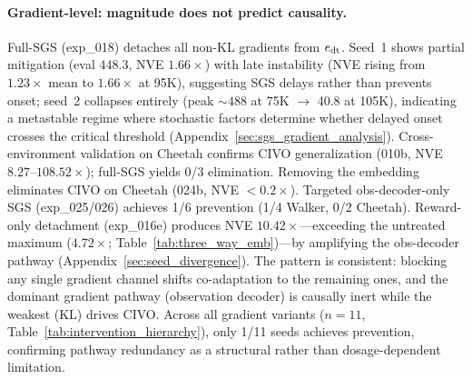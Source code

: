 \paragraph{Gradient-level: magnitude does not predict causality.}
Full-SGS (exp\_018) detaches all non-KL gradients from $e_{\mathrm{dt}}$. Seed~1 shows partial mitigation (eval 448.3, NVE $1.66\times$) with late instability (NVE rising from $1.23\times$ mean to $1.66\times$ at 95K), suggesting SGS delays rather than prevents onset; seed~2 collapses entirely (peak ${\sim}488$ at 75K $\to$ 40.8 at 105K), indicating a metastable regime where stochastic factors determine whether delayed onset crosses the critical threshold (Appendix~\ref{sec:sgs_gradient_analysis}). Cross-environment validation on Cheetah confirms CIVO generalization (010b, NVE $8.27$--$108.52\times$); full-SGS yields 0/3 elimination. Removing the embedding eliminates CIVO on Cheetah (024b, NVE $< 0.2\times$). Targeted obs-decoder-only SGS (exp\_025/026) achieves 1/6 prevention (1/4 Walker, 0/2 Cheetah). Reward-only detachment (exp\_016e) produces NVE $10.42\times$---exceeding the untreated maximum ($4.72\times$; Table~\ref{tab:three_way_emb})---by amplifying the obs-decoder pathway (Appendix~\ref{sec:seed_divergence}). The pattern is consistent: blocking any single gradient channel shifts co-adaptation to the remaining ones, and the dominant gradient pathway (observation decoder) is causally inert while the weakest (KL) drives CIVO. Across all gradient variants ($n{=}11$, Table~\ref{tab:intervention_hierarchy}), only 1/11 seeds achieves prevention, confirming pathway redundancy as a structural rather than dosage-dependent limitation.

